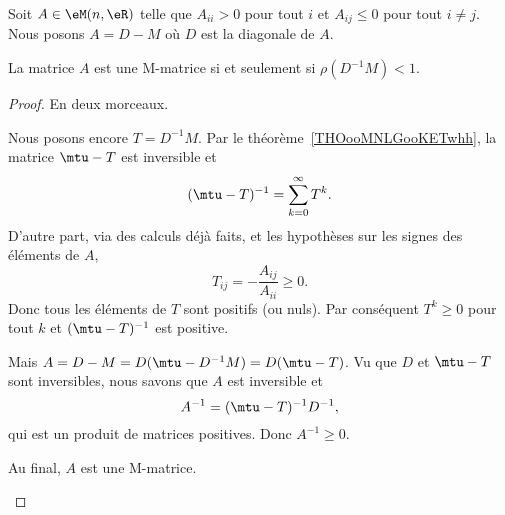 \begin{proposition}     \label{PROPooWVHXooCfsvGq}
	Soit \( A\in \eM(n,\eR)\) telle que \( A_{ii}>0\) pour tout \( i\) et \( A_{ij}\leq 0\) pour tout \( i\neq j\). Nous posons \( A=D-M\) où \( D\) est la diagonale de \( A\).

	La matrice \( A\) est une M-matrice si et seulement si \( \rho(D^{-1}M)<1\).
\end{proposition}

\begin{proof}
	En deux morceaux.
	\begin{subproof}
		\spitem[Si \( \rho(D^{-1}M)<1\)]
		Nous posons encore \( T=D^{-1}M\). Par le théorème~\ref{THOooMNLGooKETwhh}, la matrice \( \mtu-T\) est inversible et
		\begin{equation}
			(\mtu-T)^{-1}=\sum_{k=0}^{\infty}T^k.
		\end{equation}
		D'autre part, via des calculs déjà faits, et les hypothèses sur les signes des éléments de \( A\),
		\begin{equation}
			T_{ij}=-\frac{ A_{ij} }{ A_{ii} }\geq 0.
		\end{equation}
		Donc tous les éléments de \( T\) sont positifs (ou nuls). Par conséquent \( T^k\geq 0\) pour tout \( k\) et \( (\mtu-T)^{-1}\) est positive.

		Mais \( A=D-M=D(\mtu-D^{-1}M)=D(\mtu-T)\). Vu que \( D\) et \( \mtu-T\) sont inversibles, nous savons que \( A\) est inversible et
		\begin{equation}
			A^{-1}=(\mtu-T)^{-1}D^{-1},
		\end{equation}
		qui est un produit de matrices positives. Donc \( A^{-1}\geq 0\).

		Au final, \( A\) est une M-matrice.




\end{subproof}
\end{proof}
